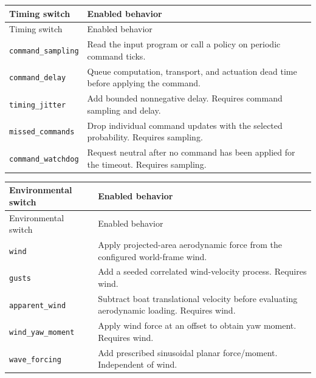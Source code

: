 \documentclass[10pt,letterpaper]{article}
\begin{document}
{\footnotesize
\setlength{\tabcolsep}{5pt}
\renewcommand{\arraystretch}{1.18}
\begin{longtable}{@{}>{\raggedright\arraybackslash}p{}>{\raggedright\arraybackslash}p{}@{}}
\toprule
Timing switch & Enabled behavior \\
\midrule
\endfirsthead
\toprule
Timing switch & Enabled behavior \\
\midrule
\endhead
\bottomrule
\endfoot
\texttt{command\_sampling} & Read the input program or call a policy on periodic command ticks. \\
\addlinespace[3pt]
\texttt{command\_delay} & Queue computation, transport, and actuation dead time before applying the command. \\
\addlinespace[3pt]
\texttt{timing\_jitter} & Add bounded nonnegative delay. Requires command sampling and delay. \\
\addlinespace[3pt]
\texttt{missed\_commands} & Drop individual command updates with the selected probability. Requires sampling. \\
\addlinespace[3pt]
\texttt{command\_watchdog} & Request neutral after no command has been applied for the timeout. Requires sampling. \\
\end{longtable}
}



{\footnotesize
\setlength{\tabcolsep}{5pt}
\renewcommand{\arraystretch}{1.18}
\begin{longtable}{@{}>{\raggedright\arraybackslash}p{}>{\raggedright\arraybackslash}p{}@{}}
\toprule
Environmental switch & Enabled behavior \\
\midrule
\endfirsthead
\toprule
Environmental switch & Enabled behavior \\
\midrule
\endhead
\bottomrule
\endfoot
\texttt{wind} & Apply projected-area aerodynamic force from the configured world-frame wind. \\
\addlinespace[3pt]
\texttt{gusts} & Add a seeded correlated wind-velocity process. Requires wind. \\
\addlinespace[3pt]
\texttt{apparent\_wind} & Subtract boat translational velocity before evaluating aerodynamic loading. Requires wind. \\
\addlinespace[3pt]
\texttt{wind\_yaw\_moment} & Apply wind force at an offset to obtain yaw moment. Requires wind. \\
\addlinespace[3pt]
\texttt{wave\_forcing} & Add prescribed sinusoidal planar force/moment. Independent of wind. \\
\end{longtable}
}
\end{document}
